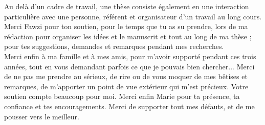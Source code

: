 Au delà d'un cadre de travail, une thèse consiste également en une interaction particulière avec une personne, référent et organisateur d'un travail au long cours. Merci Fawzi pour ton soutien, pour le temps que tu as su prendre, lors de ma rédaction pour organiser les idées et le manuscrit et tout au long de ma thèse ; pour tes suggestions, demandes et remarques pendant mes recherches.\\

Merci enfin à ma famille et à mes amis, pour m'avoir supporté pendant ces trois années, tout en vous demandant parfois ce que je pouvais bien chercher... Merci de ne pas me prendre au sérieux, de rire ou de vous moquer de mes bêtises et remarques, de m'apporter un point de vue extérieur qui m'est précieux. Votre soutien compte beaucoup pour moi. Merci enfin Marie pour ta présence, ta confiance et tes encouragements. Merci de supporter tout mes défauts, et de me pousser vers le meilleur.\\